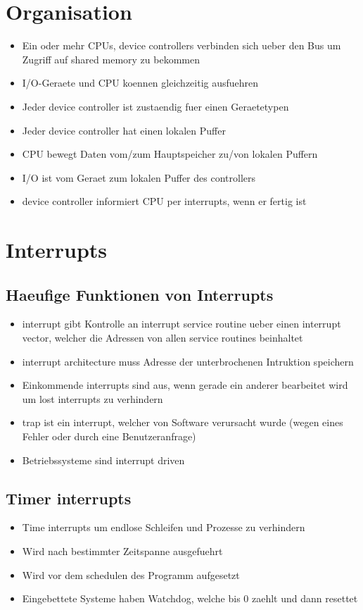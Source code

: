 \documentclass[a4paper]{scrreprt}
\begin{document}
\section{Organisation}
\begin{itemize}
	\item Ein oder mehr CPUs, device controllers verbinden sich ueber den Bus um Zugriff auf shared memory zu bekommen
	\item I/O-Geraete und CPU koennen gleichzeitig ausfuehren
	\item Jeder device controller ist zustaendig fuer einen Geraetetypen
	\item Jeder device controller hat einen lokalen Puffer
	\item CPU bewegt Daten vom/zum Hauptspeicher zu/von lokalen Puffern
	\item I/O ist vom Geraet zum lokalen Puffer des controllers
	\item device controller informiert CPU per interrupts, wenn er fertig ist
\end{itemize}


\section{Interrupts}
\subsection{Haeufige Funktionen von Interrupts}
\begin{itemize}
	\item interrupt gibt Kontrolle an interrupt service routine ueber einen interrupt vector, welcher die Adressen von allen service routines beinhaltet
	\item interrupt architecture muss Adresse der unterbrochenen Intruktion speichern
	\item Einkommende interrupts sind aus, wenn gerade ein anderer bearbeitet wird um lost interrupts zu verhindern
	\item trap ist ein interrupt, welcher von Software verursacht wurde (wegen eines Fehler oder durch eine Benutzeranfrage)
	\item Betriebssysteme sind interrupt driven
\end{itemize}

\subsection{Timer interrupts}
\begin{itemize}
	\item Time interrupts um endlose Schleifen und Prozesse zu verhindern
	\item Wird nach bestimmter Zeitspanne ausgefuehrt
	\item Wird vor dem schedulen des Programm aufgesetzt
	\item Eingebettete Systeme haben Watchdog, welche bis 0 zaehlt und dann resettet
\end{itemize}
\end{document}
